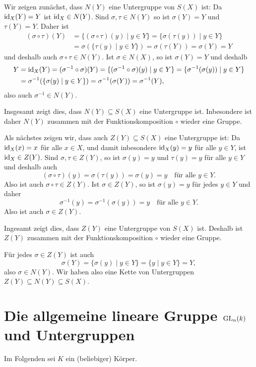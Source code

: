 Wir zeigen zunächst, dass $N(Y)$ eine Untergruppe von $S(X)$ ist: Da $\mathrm{id}_X(Y) = Y$ ist $\mathrm{id}_X \in N(Y)$. Sind $\sigma, \tau \in N(Y)$ so ist $\sigma(Y) = Y$ und $\tau(Y) = Y$. Daher ist
\begin{align*}
 (\sigma \circ \tau)(Y)
 &= \{(\sigma \circ \tau)(y) \mid y \in Y\}
 = \{\sigma(\tau(y)) \mid y \in Y\} \\
 &= \sigma(\{\tau(y) \mid y \in Y\})
 = \sigma(\tau(Y))
 = \sigma(Y)
 = Y
\end{align*}
und deshalb auch $\sigma \circ \tau \in N(Y)$. Ist $\sigma \in N(X)$, so ist $\sigma(Y) = Y$ und deshalb
\begin{align*}
 Y
 &= \mathrm{id}_X(Y)
 = (\sigma^{-1} \circ \sigma)(Y)
 = \{(\sigma^{-1} \circ \sigma)(y) \mid y \in Y\}
 = \{\sigma^{-1}(\sigma(y)) \mid y \in Y\} \\
 &= \sigma^{-1}(\{\sigma(y) \mid y \in Y\})
 = \sigma^{-1}(\sigma(Y))
 = \sigma^{-1}(Y),
\end{align*}
also auch $\sigma^{-1} \in N(Y)$.

Insgesamt zeigt dies, dass $N(Y) \subseteq S(X)$ eine Untergruppe ist. Inbesondere ist daher $N(Y)$ zusammen mit der Funktionskomposition $\circ$ wieder eine Gruppe.

Als nächstes zeigen wir, dass auch $Z(Y) \subseteq S(X)$ eine Untergruppe ist: Da $\mathrm{id}_X(x) = x$ für alle $x \in X$, und damit inbesondere $\mathrm{id}_X(y) = y$ für alle $y \in Y$, ist $\mathrm{id}_X \in Z(Y)$. Sind $\sigma, \tau \in Z(Y)$, so ist $\sigma(y) = y$ und $\tau(y) = y$ für alle $y \in Y$ und deshalb auch
\[
 (\sigma \circ \tau)(y)
 = \sigma(\tau(y))
 = \sigma(y)
 = y
 \quad
 \text{für alle $y \in Y$}.
\]
Also ist auch $\sigma \circ \tau \in Z(Y)$. Ist $\sigma \in Z(Y)$, so ist $\sigma(y) = y$ für jedes $y \in Y$ und daher
\[
 \sigma^{-1}(y) = \sigma^{-1}(\sigma(y)) = y
 \quad
 \text{für alle $y \in Y$}.
\]
Also ist auch $\sigma \in Z(Y)$.

Ingesamt zeigt dies, dass $Z(Y)$ eine Untergruppe von $S(X)$ ist. Deshalb ist $Z(Y)$ zusammen mit der Funktionskomposition $\circ$ wieder eine Gruppe.

Für jedes $\sigma \in Z(Y)$ ist auch
\[
 \sigma(Y)
 = \{\sigma(y) \mid y \in Y\}
 = \{y \mid y \in Y\}
 = Y,
\]
also $\sigma \in N(Y)$. Wir haben also eine Kette von Untergruppen $Z(Y) \subseteq N(Y) \subseteq S(X)$.





\section{Die allgemeine lineare Gruppe \texorpdfstring{$\mathrm{GL}_n(k)$}{GLnk} und Untergruppen}
Im Folgenden sei $K$ ein (beliebiger) Körper.

